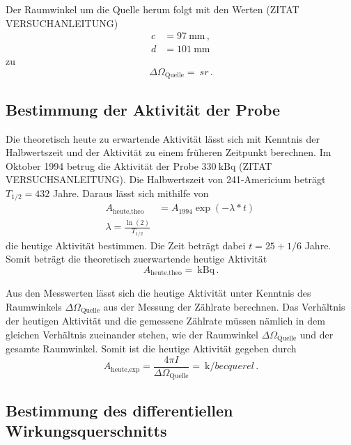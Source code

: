 Der Raumwinkel um die Quelle herum folgt mit den Werten (ZITAT VERSUCHANLEITUNG)
\begin{align*}
  c &= \SI{97}{\milli\meter} \,, \\
  d &= \SI{101}{\milli\meter}
\end{align*}
zu
\begin{equation*}
  \Delta \Omega_\text{Quelle} = \SI{}{sr} \,.
\end{equation*}

\subsection{Bestimmung der Aktivität der Probe}
\label{subsec:aktivitaet}

Die theoretisch heute zu erwartende Aktivität lässt sich mit Kenntnis der Halbwertszeit
und der Aktivität zu einem früheren Zeitpunkt berechnen. Im Oktober 1994 betrug die
Aktivität der Probe $\SI{330}{\kilo\becquerel}$ (ZITAT VERSUCHSANLEITUNG). Die Halbwertszeit
von 241-Americium beträgt $T_{1/2}=432$ Jahre. Daraus lässt sich mithilfe von
\begin{align*}
  A_{\text{heute,theo}}&= A_{1994}\exp(-\lambda*t) \, \\
  \lambda= \frac{\ln(2)}{T_{1/2}}
\end{align*}
die heutige Aktivität bestimmen. Die Zeit beträgt dabei $t=25+1/6$ Jahre. Somit beträgt die
theoretisch zuerwartende heutige Aktivität
\begin{equation*}
  A_{\text{heute,theo}}= \SI{}{\kilo\becquerel} \,.
\end{equation*}

Aus den Messwerten lässt sich die heutige Aktivität unter
Kenntnis des Raumwinkels $\Delta \Omega_{\text{Quelle}}$ aus der Messung der Zählrate berechnen.
Das Verhältnis der heutigen Aktivität und die gemessene Zählrate müssen nämlich in
dem gleichen Verhältnis zueinander stehen, wie der Raumwinkel $\Delta \Omega_{\text{Quelle}}$ und
der gesamte Raumwinkel. Somit ist die heutige Aktivität gegeben durch
\begin{equation*}
  A_{\text{heute,exp}}=\frac{4 \pi  I}{\Delta \Omega_{\text{Quelle}}}=\SI{}{\kilo/becquerel} \,.
\end{equation*}


\subsection{Bestimmung des differentiellen Wirkungsquerschnitts}
\label{subsec:wq}

